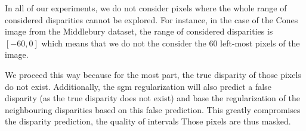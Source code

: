 \begin{remark}
    In all of our experiments, we do not consider pixels where the whole range of considered disparities cannot be explored. For instance, in the case of the Cones image from the Middlebury dataset, the range of considered disparities is $[-60,0]$ which means that we do not the consider the 60 left-most pixels of the image.
    
    We proceed this way because for the most part, the true disparity of those pixels do not exist. Additionally, the \acrshort{sgm} regularization will also predict a false disparity (as the true disparity does not exist) and base the regularization of the neighbouring disparities based on this false prediction. This greatly compromises the disparity prediction, the quality of intervals \etc Those pixels are thus masked.
\end{remark}

